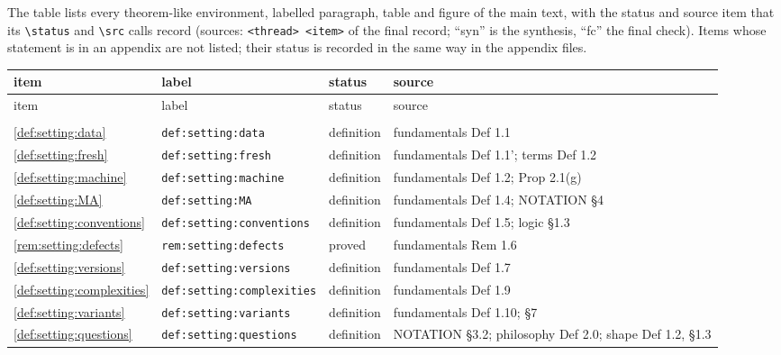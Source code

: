 The table lists every theorem-like environment, labelled paragraph, table and figure of the main text, with the status and source item that its \verb|\status| and \verb|\src| calls record (sources: \texttt{<thread> <item>} of the final record; ``syn'' is the synthesis, ``fc'' the final check). Items whose statement is in an appendix are not listed; their status is recorded in the same way in the appendix files.

{\scriptsize
\renewcommand{\arraystretch}{1.05}\setlength{\tabcolsep}{3pt}
\begin{longtable}{@{}>{\raggedright\arraybackslash}p{}>{\raggedright\arraybackslash}p{}>{\raggedright\arraybackslash}p{}>{\raggedright\arraybackslash}p{}@{}}
\toprule
item & label & status & source\\
\endfirsthead
\toprule
item & label & status & source\\
\endhead
\bottomrule
\endfoot
\midrule
\multicolumn{4}{@{}l}{\texttt{setting.tex}}\\
\cref{def:setting:data} & \texttt{def:\allowbreak setting:\allowbreak data} & definition & fundamentals Def 1.1\\
\cref{def:setting:fresh} & \texttt{def:\allowbreak setting:\allowbreak fresh} & definition & fundamentals Def 1.1'; terms Def 1.2\\
\cref{def:setting:machine} & \texttt{def:\allowbreak setting:\allowbreak machine} & definition & fundamentals Def 1.2; Prop 2.1(g)\\
\cref{def:setting:MA} & \texttt{def:\allowbreak setting:\allowbreak MA} & definition & fundamentals Def 1.4; NOTATION \S4\\
\cref{def:setting:conventions} & \texttt{def:\allowbreak setting:\allowbreak conventions} & definition & fundamentals Def 1.5; logic \S1.3\\
\cref{rem:setting:defects} & \texttt{rem:\allowbreak setting:\allowbreak defects} & proved & fundamentals Rem 1.6\\
\cref{def:setting:versions} & \texttt{def:\allowbreak setting:\allowbreak versions} & definition & fundamentals Def 1.7\\
\cref{def:setting:complexities} & \texttt{def:\allowbreak setting:\allowbreak complexities} & definition & fundamentals Def 1.9\\
\cref{def:setting:variants} & \texttt{def:\allowbreak setting:\allowbreak variants} & definition & fundamentals Def 1.10; \S7\\
\cref{def:setting:questions} & \texttt{def:\allowbreak setting:\allowbreak questions} & definition & NOTATION \S3.2; philosophy Def 2.0; shape Def 1.2, \S1.3\\

\end{longtable}}
